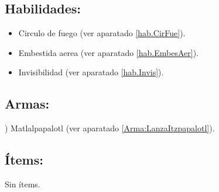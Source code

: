 \subsection{Habilidades:}
\begin{itemize}
	\item Circulo de fuego (ver aparatado \ref{hab.CirFue}).
	\item Embestida aerea (ver aparatado \ref{hab.EmbesAer}).
	\item Invisibilidad (ver aparatado \ref{hab.Invis}).
\end{itemize}
\subsection{Armas:})
Matlalpapalotl (ver aparatado \ref{Arma:LanzaItzpapalotl}).
\subsection{Ítems:}
Sin ítems.
